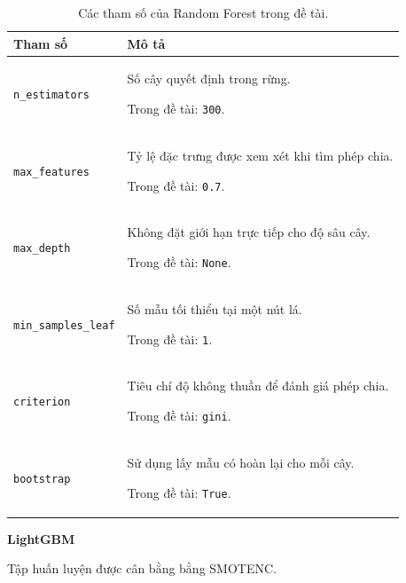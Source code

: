 \documentclass[a4paper]{article}
\begin{document}
\begin{table}[H]
\centering
\small
\caption{Các tham số của Random Forest trong đề tài.}
\label{tab:rf-parameters}
\begin{tabularx}{\textwidth}{|p{3.7cm}|X|}
\hline
\textbf{Tham số} & \textbf{Mô tả} \\ \hline
\texttt{n\_estimators} & Số cây quyết định trong rừng.\par\smallskip Trong đề tài: \texttt{300}. \\ \hline
\texttt{max\_features} & Tỷ lệ đặc trưng được xem xét khi tìm phép chia.\par\smallskip Trong đề tài: \texttt{0.7}. \\ \hline
\texttt{max\_depth} & Không đặt giới hạn trực tiếp cho độ sâu cây.\par\smallskip Trong đề tài: \texttt{None}. \\ \hline
\texttt{min\_samples\_leaf} & Số mẫu tối thiểu tại một nút lá.\par\smallskip Trong đề tài: \texttt{1}. \\ \hline
\texttt{criterion} & Tiêu chí độ không thuần để đánh giá phép chia.\par\smallskip Trong đề tài: \texttt{gini}. \\ \hline
\texttt{bootstrap} & Sử dụng lấy mẫu có hoàn lại cho mỗi cây.\par\smallskip Trong đề tài: \texttt{True}. \\ \hline
\end{tabularx}
\end{table}

\noindent\textbf{LightGBM}\par
Tập huấn luyện được cân bằng bằng SMOTENC.
\end{document}
